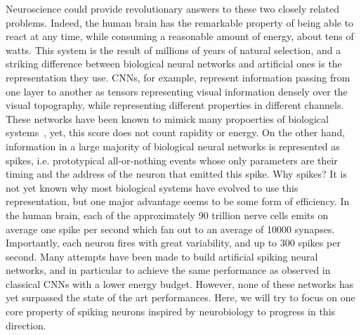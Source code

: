 \documentclass[default]{sn-jnl}%
\theoremstyle{thmstyleone}%
\theoremstyle{thmstyletwo}%
\theoremstyle{thmstylethree}%
\begin{document}
Neuroscience could provide revolutionary answers to these two closely related problems. Indeed, the human brain has the remarkable property of being able to react at any time, while consuming a reasonable amount of energy, about tens of watts. This system is the result of millions of years of natural selection, and a striking difference between biological neural networks and artificial ones is the representation they use. CNNs, for example, represent information passing from one layer to another as tensors representing visual information densely over the visual topography, while representing different properties in different channels. These networks have been known to mimick many propoerties of biological systems~\citep{Schrimpf2020}, yet, this score does not count rapidity or energy. On the other hand, information in a large majority of biological neural networks is represented as spikes, i.e. prototypical all-or-nothing events whose only parameters are their timing and the address of the neuron that emitted this spike. Why spikes? It is not yet known why most biological systems have evolved to use this representation, but one major advantage seems to be some form of efficiency. In the human brain, each of the approximately 90 trillion nerve cells emits on average one spike per second which fan out to an average of 10000 synapses. Importantly, each neuron fires with great variability, and up to 300 spikes per second. Many attempts have been made to build artificial spiking neural networks, and in particular to achieve the same performance as observed in classical CNNs with a lower energy budget. However, none of these networks has yet surpassed the state of the art performances. Here, we will try to focus on one core property of spiking neurons inspired by neurobiology to progress in this direction.
%
\end{document}
